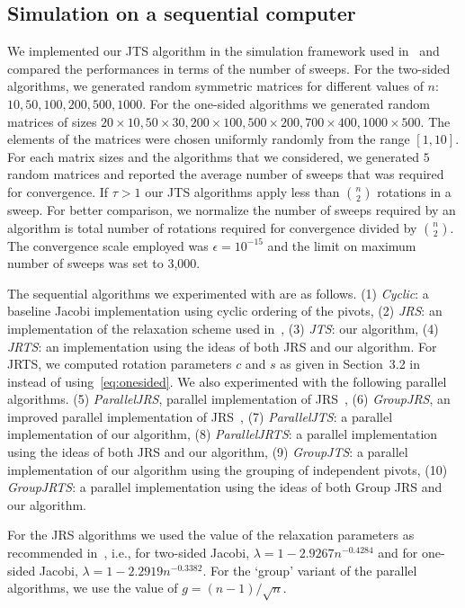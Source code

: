 \documentclass[10pt, conference, compsocconf]{IEEEtran}
\begin{document}
\subsection{Simulation on a sequential computer}

We implemented our JTS algorithm in the simulation framework used in~\cite{rajasekaran2008relaxation} and compared the performances in terms of the number
of sweeps. For the two-sided algorithms, we generated random symmetric matrices for different values of $n$: $10, 50, 100, 200, 500, 1000$. For the one-sided algorithms we generated random matrices of sizes $20 \times 10, 50 \times 30, 200 \times 100, 500 \times 200, 700 \times 400, 1000 \times 500$.  The elements of the matrices were chosen uniformly randomly from the range $[1,10]$. For each matrix sizes and the algorithms that we considered, we generated $5$ random matrices and reported the average number of sweeps that was required for convergence. If $\tau > 1$ our JTS algorithms apply less than ${n \choose 2}$ rotations in a sweep. For better comparison, we normalize the number of sweeps required by an algorithm is total number of rotations required for convergence divided by ${n \choose 2}$. The convergence scale employed was $\epsilon = 10^{-15}$ and the limit on maximum number of sweeps was set to 3,000.

The sequential algorithms we experimented with are as follows. (1) \emph{Cyclic}:  a baseline Jacobi implementation using cyclic ordering of the pivots, (2) \emph{JRS}: an implementation of the relaxation scheme used in~\cite{rajasekaran2008relaxation}, (3) \emph{JTS}: our algorithm, (4) \emph{JRTS}: an implementation using the ideas of both JRS and our algorithm. For JRTS, we computed rotation parameters $c$ and $s$ as given in Section~3.2 in~\cite{rajasekaran2008relaxation} instead of using~\eqref{eq:onesided}.  We also experimented with the following parallel algorithms. (5) \emph{ParallelJRS}, parallel implementation of JRS~\cite{rajasekaran2008relaxation}, (6) \emph{GroupJRS}, an improved parallel implementation of JRS~\cite{rajasekaran2008relaxation}, (7) \emph{ParallelJTS}: a parallel implementation of our algorithm, (8) \emph{ParallelJRTS}: a parallel implementation using the ideas of both JRS and our algorithm, (9)   \emph{GroupJTS}: a parallel implementation of our algorithm using the grouping of independent pivots, (10) \emph{GroupJRTS}: a parallel implementation using the ideas of both Group JRS and our algorithm.

For the JRS algorithms we used the value of the relaxation parameters as recommended in~\cite{rajasekaran2008relaxation}, i.e., for two-sided Jacobi, $\lambda = 1- 2.9267n^{-0.4284}$ and for one-sided Jacobi, $\lambda = 1 - 2.2919 n^{-0.3382}$. For the `group' variant of the parallel algorithms, we use the value of $g = (n-1)/\sqrt{n}$. 
\end{document}
